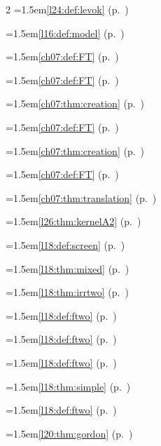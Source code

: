 \begin{multicols}{2}
\hangindent=1.5em\quad \ref{l24:def:levok} (p.~\pageref{l24:def:levok})\par
\hangindent=1.5em\quad \ref{l16:def:model} (p.~\pageref{l16:def:model})\par
\hangindent=1.5em\quad \ref{ch07:def:FT} (p.~\pageref{ch07:def:FT})\par
\hangindent=1.5em\quad \ref{ch07:def:FT} (p.~\pageref{ch07:def:FT})\par
\hangindent=1.5em\quad \ref{ch07:thm:creation} (p.~\pageref{ch07:thm:creation})\par
\hangindent=1.5em\quad \ref{ch07:def:FT} (p.~\pageref{ch07:def:FT})\par
\hangindent=1.5em\quad \ref{ch07:thm:creation} (p.~\pageref{ch07:thm:creation})\par
\hangindent=1.5em\quad \ref{ch07:def:FT} (p.~\pageref{ch07:def:FT})\par
\hangindent=1.5em\quad \ref{ch07:thm:translation} (p.~\pageref{ch07:thm:translation})\par
\hangindent=1.5em\quad \ref{l26:thm:kernelA2} (p.~\pageref{l26:thm:kernelA2})\par
\hangindent=1.5em\quad \ref{l18:def:screen} (p.~\pageref{l18:def:screen})\par
\hangindent=1.5em\quad \ref{l18:thm:mixed} (p.~\pageref{l18:thm:mixed})\par
\hangindent=1.5em\quad \ref{l18:thm:irrtwo} (p.~\pageref{l18:thm:irrtwo})\par
\hangindent=1.5em\quad \ref{l18:def:ftwo} (p.~\pageref{l18:def:ftwo})\par
\hangindent=1.5em\quad \ref{l18:def:ftwo} (p.~\pageref{l18:def:ftwo})\par
\hangindent=1.5em\quad \ref{l18:def:ftwo} (p.~\pageref{l18:def:ftwo})\par
\hangindent=1.5em\quad \ref{l18:thm:simple} (p.~\pageref{l18:thm:simple})\par
\hangindent=1.5em\quad \ref{l18:def:ftwo} (p.~\pageref{l18:def:ftwo})\par
\hangindent=1.5em\quad \ref{l20:thm:gordon} (p.~\pageref{l20:thm:gordon})\par

\end{multicols}
